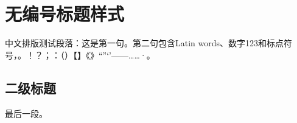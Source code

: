 \documentclass[a4paper,10pt,UTF8,scheme=chinese,heading=false]{ctexart}
\begin{document}
\section{无编号标题样式}
中文排版测试段落：这是第一句。第二句包含Latin words、数字123和标点符号，。！？；：（）【】《》“”‘’——……·。
\subsection{二级标题}
最后一段。
\end{document}
